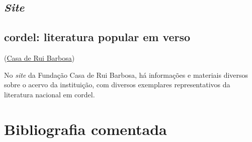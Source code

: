 \documentclass[12pt]{extarticle}
\begin{document}
  \subsection{\emph{Site}}


\subsection{cordel: literatura popular em verso }

(\href{http://www.casaruibarbosa.gov.br/cordel/acervo.html}{Casa de Rui Barbosa})

No \emph{site} da Fundação Casa de Rui Barbosa, há informações e
materiais diversos sobre o acervo da instituição, com diversos
exemplares representativos da literatura nacional em cordel.

\section {Bibliografia comentada}
\end{document}
